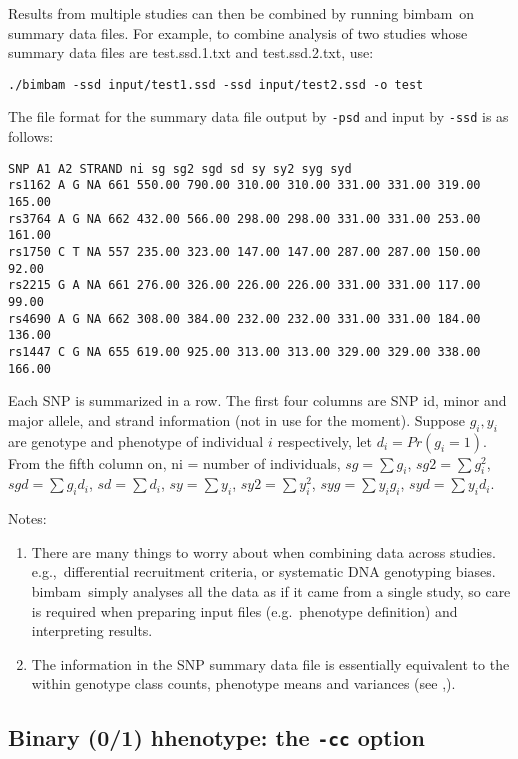 \documentclass[11pt,Palatino]{article}
\def\bimbam{{\sc bimbam}~}
\begin{document}
Results from multiple studies can then be combined by running \bimbam on summary data files. For example, to combine analysis of two studies whose summary data files are test.ssd.1.txt and test.ssd.2.txt, use:   
\begin{verbatim}
./bimbam -ssd input/test1.ssd -ssd input/test2.ssd -o test
\end{verbatim}
The file format for the summary data file output by {\tt -psd} and input by {\tt -ssd} is as follows:
\begin{verbatim}
SNP A1 A2 STRAND ni sg sg2 sgd sd sy sy2 syg syd
rs1162 A G NA 661 550.00 790.00 310.00 310.00 331.00 331.00 319.00 165.00
rs3764 A G NA 662 432.00 566.00 298.00 298.00 331.00 331.00 253.00 161.00
rs1750 C T NA 557 235.00 323.00 147.00 147.00 287.00 287.00 150.00 92.00
rs2215 G A NA 661 276.00 326.00 226.00 226.00 331.00 331.00 117.00 99.00
rs4690 A G NA 662 308.00 384.00 232.00 232.00 331.00 331.00 184.00 136.00
rs1447 C G NA 655 619.00 925.00 313.00 313.00 329.00 329.00 338.00 166.00
\end{verbatim}
Each SNP is summarized in a row. The first four columns are SNP id, minor and major allele, and strand information (not in use for the moment). Suppose $g_i, y_i$ are genotype and phenotype of individual $i$ respectively, let $d_i = Pr(g_i=1)$. From the fifth column on, ni = number of individuals, $sg = \sum{g_i}$, $sg2=\sum{g_i^2}$, $sgd=\sum{g_i d_i}$, $sd=\sum{d_i}$, $sy=\sum{y_i}$, $sy2=\sum{y_i^2}$, $syg=\sum{y_i g_i}$, $syd=\sum{y_i d_i}$.   

Notes:
\begin{enumerate}
\item There are many things to worry about when combining data across studies. e.g.,~differential recruitment criteria, or systematic DNA genotyping biases. \bimbam simply analyses all the data as if it came from a single study, so care is required when preparing input files (e.g.~phenotype definition) and interpreting results.  

\item The information in the SNP summary data file is essentially equivalent to the within genotype class counts, phenotype means and variances (see \citeauthor{guan.stephens.08},\citeyear{guan.stephens.08}). 
\end{enumerate}

\subsection{Binary (0/1) hhenotype: the {\tt -cc} option}
\end{document}
